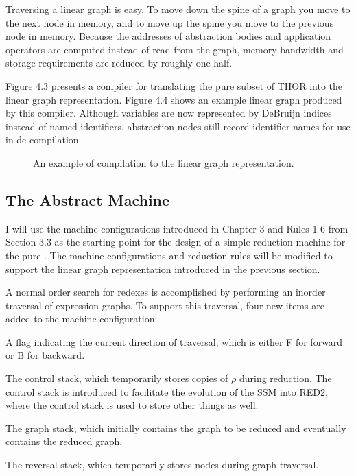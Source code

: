 Traversing a linear graph is easy. To move down the spine of a graph you move to the next node in memory, and to move up the spine you move to the previous node in memory. Because the addresses of abstraction bodies and application operators are computed instead of read from the graph, memory bandwidth and storage requirements are reduced by roughly one-half.

Figure 4.3 presents a compiler for translating the pure \lambdacalculus{} subset
of THOR into the linear graph representation. Figure 4.4 shows an example linear
graph produced by this compiler. Although variables are now represented by
DeBruijn indices instead of named identifiers, abstraction nodes still record
identifier names for use in de-compilation.

\begin{figure}[htbp]
\centering
\setlength{\fboxsep}{8pt}
\caption[Example compilation]{An example of compilation to the linear graph representation.}
\end{figure}


\subsection{The Abstract Machine}

I will use the machine configurations introduced in Chapter 3 and Rules 1-6 from Section 3.3 as the starting point for the design of a simple reduction machine for the pure \lambdacalculus{}. The machine configurations and reduction rules will be modified to support the linear graph representation introduced in the previous section.

A normal order search for redexes is accomplished by performing an inorder traversal
of expression graphs. To support this traversal, four new items are added to the
machine configuration:

\begin{description}[leftmargin=2.5em,labelwidth=1.25em,labelsep=0.5em,font=\normalfont]
\item[\(d\)] A flag indicating the current direction of traversal, which is either
F for forward or B for backward.
\item[\(c\)] The control stack, which temporarily stores copies of \(\rho\) during
reduction. The control stack is introduced to facilitate the evolution of the SSM
into RED2, where the control stack is used to store other things as well.
\item[\(g\)] The graph stack, which initially contains the graph to be reduced and
eventually contains the reduced graph.
\item[\(r\)] The reversal stack, which temporarily stores nodes during graph
traversal.
\end{description}

